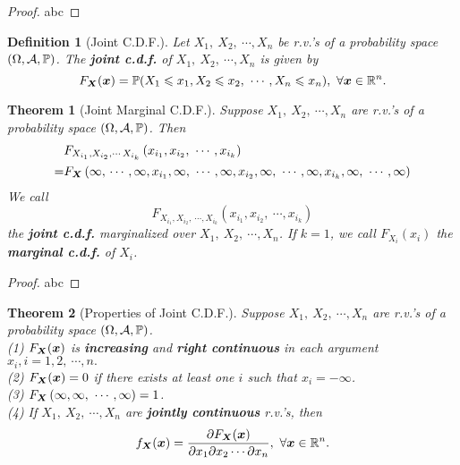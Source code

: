 \documentclass[openany,12pt]{book}
\newtheorem{theorem}{Theorem}[chapter]
\newtheorem{definition}{Definition}[chapter]
\begin{document}
\begin{proof}
  abc
\end{proof}

\begin{definition}[Joint C.D.F.]
Let $X_{1},\ X_{2},\ \cdots,X_{n}$ be r.v.'s of a probability space $(\Omega,\mathcal{A},\mathbb{P})$. The \textbf{joint c.d.f.} of $X_{1},\ X_{2},\ \cdots,X_{n}$ is given by
\[F_{\bm{X}}(\bm{x}) = \mathbb{P}( X_{1} \leqslant x_{1},X_{2} \leqslant x_{2},\ \cdots,X_{n} \leqslant x_{n}),\ \forall\bm{x} \in \mathbb{R}^{n}.\]
\end{definition}

\begin{theorem}[Joint Marginal C.D.F.]
Suppose $X_{1},\ X_{2},\ \cdots,X_{n}$ are r.v.'s of a probability space $(\Omega,\mathcal{A},\mathbb{P})$. Then
\[\begin{aligned}
&F_{X_{i_{1}},X_{i_{2}},\cdots\,X_{i_{k}}}\left( x_{i_{1}},x_{i_{2}},\ \cdots,x_{i_{k}} \right) \\
=& F_{\mX}\left( \infty,\, \cdots,\infty,x_{i_{1}},\infty,\ \cdots,\infty,x_{i_{2}},\infty,\ \cdots,\infty,x_{i_{k}},\infty,\ \cdots,\infty \right)
\end{aligned}\]
We call \[F_{X_{i_{1}},X_{i_{2}},\ \cdots,X_{i_{k}}}\left( x_{i_{1}},x_{i_{2}},\ \cdots,x_{i_{k}} \right)\] the \textbf{joint c.d.f.} marginalized over $X_{1},\ X_{2},\ \cdots,X_{n}$. If $k = 1$, we call $F_{X_{i}}(x_{i})$ the \textbf{marginal c.d.f.} of $X_{i}$.
\end{theorem}

\begin{proof}
  abc
\end{proof}

\begin{theorem}[Properties of Joint C.D.F.]
Suppose $X_{1},\ X_{2},\ \cdots,X_{n}$ are r.v.'s of a probability
space $(\Omega,\mathcal{A},\mathbb{P})$.\\
(1) $F_{\bm{X}}(\bm{x})$ is \textbf{increasing} and \textbf{right
continuous} in each argument $x_{i},i = 1,2,\ \cdots,n.$\\
(2) $F_{\bm{X}}(\bm{x}) = 0$ if there exists at least one $i$ such
that $x_{i} = - \infty$.\\
(3) $F_{\mX}\left( \infty,\infty,\ \cdots,\infty \right) = 1$.\\
(4) If $X_{1},\ X_{2},\ \cdots,X_{n}$ are \textbf{jointly continuous}
r.v.'s, then
\[f_{\mX}(\mx) = \frac{\partial F_{\mX}(\mx)}{\partial x_{1}\partial x_{2}\cdots\partial x_{n}},\ \forall\mx \in \mathbb{R}^{n}.\]
\end{theorem}
\end{document}
